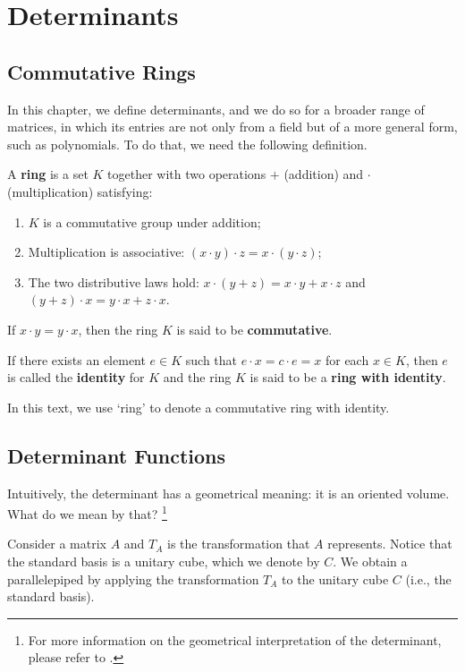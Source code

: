 \chapter{Determinants}

\section{Commutative Rings}

In this chapter, we define determinants, and we do so for a broader range of matrices, in which its entries are not only from a field but of a more general form, such as polynomials. To do that, we need the following definition.

\begin{definition}[Ring]
	A \textbf{ring}	is a set $K$ together with two operations $+$ (addition) and $\cdot$ (multiplication) satisfying:
	\begin{enumerate}
		\item $K$ is a commutative group under addition;
		\item Multiplication is associative: $(x \cdot y) \cdot z = x \cdot (y \cdot z)$;
		\item The two distributive laws hold: $x \cdot (y + z) = x \cdot y + x \cdot z$ and $(y + z) \cdot x = y\cdot x + z \cdot x$.
	\end{enumerate}
	
	If $x \cdot y = y \cdot x$, then the ring $K$ is said to be \textbf{commutative}.
	
	If there exists an element $e \in K$ such that $e \cdot x = c \cdot e = x$ for each $x \in K$, then $e$ is called the \textbf{identity} for $K$ and the ring $K$ is said to be a \textbf{ring with identity}.
\end{definition}

In this text, we use `ring' to denote a commutative ring with identity.

\section{Determinant Functions}

Intuitively, the determinant has a geometrical meaning: it is an oriented volume. What do we mean by that? \footnote{For more information on the geometrical interpretation of the determinant, please refer to \cite{dieudonne1969linear}.}

Consider a matrix $A$ and $T_A$ is the transformation that $A$ represents. Notice that the standard basis is a unitary cube, which we denote by $C$. We obtain a parallelepiped by applying the transformation $T_A$ to the unitary cube $C$ (i.e., the standard basis).

